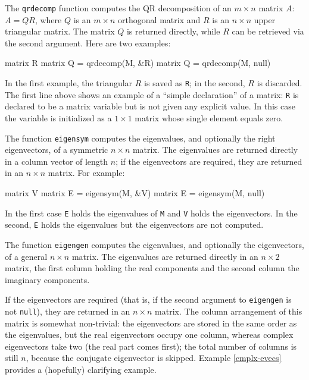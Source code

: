 The \texttt{qrdecomp} function computes the QR decomposition of an $m
\times n$ matrix $A$: $A = QR$, where $Q$ is an $m \times n$
orthogonal matrix and $R$ is an $n \times n$ upper triangular matrix.
The matrix $Q$ is returned directly, while $R$ can be retrieved via
the second argument.  Here are two examples:
%
\begin{code}
matrix R
matrix Q = qrdecomp(M, &R)
matrix Q = qrdecomp(M, null)
\end{code}
%
In the first example, the triangular $R$ is saved as \texttt{R}; in
the second, $R$ is discarded.  The first line above shows an example
of a ``simple declaration'' of a matrix: \texttt{R} is
declared to be a matrix variable but is not given any explicit value.
In this case the variable is initialized as a $1\times 1$ matrix whose
single element equals zero.

The function \texttt{eigensym} computes the eigenvalues, and
optionally the right eigenvectors, of a symmetric $n \times n$ matrix.
The eigenvalues are returned directly in a column vector of length
$n$; if the eigenvectors are required, they are returned in an $n
\times n$ matrix.  For example:
%
\begin{code}
matrix V
matrix E = eigensym(M, &V)
matrix E = eigensym(M, null)
\end{code}
%
In the first case \texttt{E} holds the eigenvalues of \texttt{M} and
\texttt{V} holds the eigenvectors.  In the second, \texttt{E} holds
the eigenvalues but the eigenvectors are not computed.

The function \texttt{eigengen} computes the eigenvalues, and
optionally the eigenvectors, of a general $n \times n$ matrix.  The
eigenvalues are returned directly in an $n \times 2$ matrix, the first
column holding the real components and the second column the imaginary
components.  

If the eigenvectors are required (that is, if the second argument to
\texttt{eigengen} is not \texttt{null}), they are returned in an $n
\times n$ matrix. The column arrangement of this matrix is somewhat
non-trivial: the eigenvectors are stored in the same order as the
eigenvalues, but the real eigenvectors occupy one column, whereas
complex eigenvectors take two (the real part comes first); the total
number of columns is still $n$, because the conjugate eigenvector is
skipped. Example \ref{cmplx-evecs} provides a (hopefully) clarifying
example.

